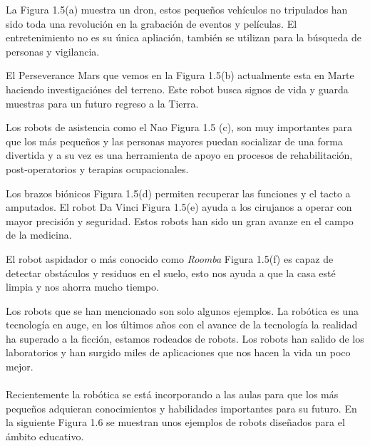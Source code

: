 La Figura 1.5(a) muestra un dron, estos pequeños vehículos no tripulados han sido toda una revolución en la grabación de eventos y películas. El entretenimiento no es su única apliación, también se utilizan para la búsqueda de personas y vigilancia. 

El Perseverance Mars que vemos en la Figura 1.5(b) actualmente esta en Marte haciendo investigaciónes del terreno. Este robot busca signos de vida y guarda muestras para un futuro regreso a la Tierra.

Los robots de asistencia como el Nao Figura 1.5 (c), son muy importantes para que los más pequeños y las personas mayores puedan socializar de una forma divertida y a su vez es una herramienta de apoyo en procesos de rehabilitación, post-operatorios y terapias ocupacionales.

Los brazos biónicos Figura 1.5(d) permiten recuperar las funciones y el tacto a amputados. El robot Da Vinci Figura 1.5(e) ayuda a los cirujanos a operar con mayor precisión y seguridad.  Estos robots han sido un gran avanze en el campo de la medicina.

El robot aspidador o más conocido como \textit{Roomba} Figura 1.5(f) es capaz de detectar obstáculos y residuos en el suelo, esto nos ayuda a que la casa esté limpia y nos ahorra mucho tiempo.

Los robots que se han mencionado son solo algunos ejemplos. La robótica es una tecnología en auge, en los últimos años con el avance de la tecnología la realidad ha superado a la ficción, estamos rodeados de robots. Los robots han salido de los laboratorios y han surgido miles de aplicaciones que nos hacen la vida un poco mejor.
\\
\\

Recientemente la robótica se está incorporando a las aulas para que los más pequeños adquieran conocimientos y habilidades importantes para su futuro. En la siguiente Figura 1.6 se muestran unos ejemplos de robots diseñados para el ámbito educativo. \cite{roboticakids}


